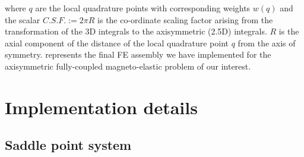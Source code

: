\documentclass[11pt,a4paper,final]{article}
\begin{document}
where $q$ are the local quadrature points with corresponding weights $w(q)$ and the scalar $C.S.F. := 2 \pi R$ is the co-ordinate scaling factor arising from the transformation of the 3D integrals to the axisymmetric (2.5D) integrals. $R$ is the axial component of the distance of the local quadrature point $q$ from the axis of symmetry.  represents the final FE assembly we have implemented for the axisymmetric fully-coupled magneto-elastic problem of our interest. \par 

\section{Implementation details}

\subsection{Saddle point system}
\end{document}
